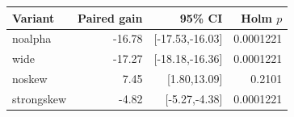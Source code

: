 \begin{tabular}{lrrr}\hline Variant & Paired gain & 95\% CI & Holm $p$\\\hline
noalpha & -16.78 & [-17.53,-16.03] & 0.0001221\\
wide & -17.27 & [-18.18,-16.36] & 0.0001221\\
noskew & 7.45 & [1.80,13.09] & 0.2101\\
strongskew & -4.82 & [-5.27,-4.38] & 0.0001221\\
\hline\end{tabular}